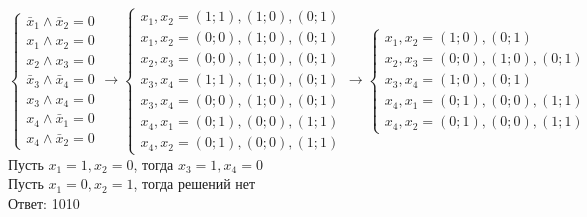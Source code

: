     \[
        \begin{cases}
            \bar x_1 \wedge \bar x_2 = 0
            \\
            x_1 \wedge x_2 = 0
            \\
            x_2 \wedge x_3 = 0
            \\
            \bar x_3 \wedge \bar x_4 = 0
            \\
            x_3 \wedge  x_4 = 0
            \\
            x_4 \wedge \bar x_1 = 0
            \\
            x_4 \wedge \bar x_2 = 0
        \end{cases}
        \rightarrow
        \begin{cases}
            x_1,  x_2 = {(1; 1), (1; 0), (0; 1)}
            \\
            x_1, x_2 = {(0; 0), (1; 0), (0; 1)}
            \\
            x_2, x_3 = {(0; 0), (1; 0), (0; 1)}
            \\
            x_3,  x_4 = {(1; 1), (1; 0), (0; 1)}
            \\
            x_3, x_4 = {(0; 0), (1; 0), (0; 1)}
            \\
            x_4,  x_1 = {(0; 1), (0; 0), (1; 1)}
            \\
            x_4,  x_2 = {(0; 1), (0; 0), (1; 1)}
        \end{cases}
        \rightarrow
        \begin{cases}
            x_1,  x_2 = {(1; 0), (0; 1)}
            \\
            x_2, x_3 = {(0; 0), (1; 0), (0; 1)}
            \\
            x_3,  x_4 = {(1; 0), (0; 1)}
            \\
            x_4,  x_1 = {(0; 1), (0; 0), (1; 1)}
            \\
            x_4,  x_2 = {(0; 1), (0; 0), (1; 1)}
        \end{cases}

    \]
    Пусть $x_1 = 1, x_2 = 0$, тогда $x_3 = 1, x_4 = 0$\\
    Пусть $x_1 = 0, x_2 = 1$, тогда решений нет\\
    Ответ: 1010


